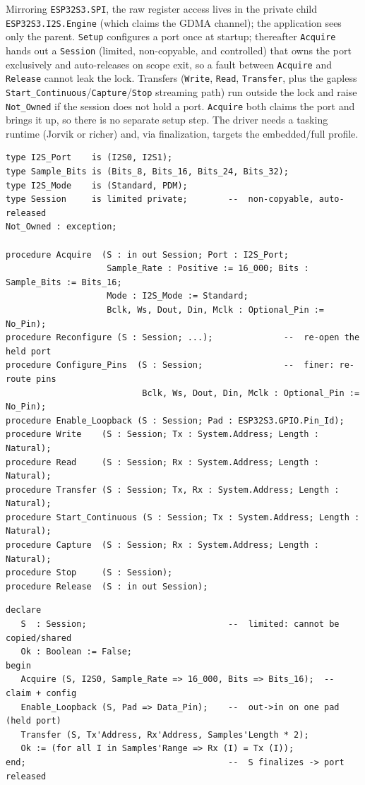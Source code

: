 Mirroring \texttt{ESP32S3.SPI}, the raw register access lives in the private child
\texttt{ESP32S3.I2S.Engine} (which claims the GDMA channel); the application sees
only the parent. \texttt{Setup} configures a port once at startup; thereafter
\texttt{Acquire} hands out a \texttt{Session} (limited, non-copyable, and
controlled) that owns the port exclusively and auto-releases on scope exit, so a
fault between \texttt{Acquire} and \texttt{Release} cannot leak the lock.
Transfers (\texttt{Write}, \texttt{Read}, \texttt{Transfer}, plus the gapless
\texttt{Start\_Continuous}/\texttt{Capture}/\texttt{Stop} streaming path) run
outside the lock and raise \texttt{Not\_Owned} if the session does not hold a
port. \texttt{Acquire} both claims the port and brings it up, so there is no
separate setup step. The driver needs a tasking runtime (Jorvik or richer) and,
via finalization, targets the embedded/full profile.

\begin{lstlisting}
type I2S_Port    is (I2S0, I2S1);
type Sample_Bits is (Bits_8, Bits_16, Bits_24, Bits_32);
type I2S_Mode    is (Standard, PDM);
type Session     is limited private;        --  non-copyable, auto-released
Not_Owned : exception;

procedure Acquire  (S : in out Session; Port : I2S_Port;
                    Sample_Rate : Positive := 16_000; Bits : Sample_Bits := Bits_16;
                    Mode : I2S_Mode := Standard;
                    Bclk, Ws, Dout, Din, Mclk : Optional_Pin := No_Pin);
procedure Reconfigure (S : Session; ...);              --  re-open the held port
procedure Configure_Pins  (S : Session;                --  finer: re-route pins
                           Bclk, Ws, Dout, Din, Mclk : Optional_Pin := No_Pin);
procedure Enable_Loopback (S : Session; Pad : ESP32S3.GPIO.Pin_Id);
procedure Write    (S : Session; Tx : System.Address; Length : Natural);
procedure Read     (S : Session; Rx : System.Address; Length : Natural);
procedure Transfer (S : Session; Tx, Rx : System.Address; Length : Natural);
procedure Start_Continuous (S : Session; Tx : System.Address; Length : Natural);
procedure Capture  (S : Session; Rx : System.Address; Length : Natural);
procedure Stop     (S : Session);
procedure Release  (S : in out Session);
\end{lstlisting}

\begin{lstlisting}
declare
   S  : Session;                            --  limited: cannot be copied/shared
   Ok : Boolean := False;
begin
   Acquire (S, I2S0, Sample_Rate => 16_000, Bits => Bits_16);  --  claim + config
   Enable_Loopback (S, Pad => Data_Pin);    --  out->in on one pad (held port)
   Transfer (S, Tx'Address, Rx'Address, Samples'Length * 2);
   Ok := (for all I in Samples'Range => Rx (I) = Tx (I));
end;                                        --  S finalizes -> port released
\end{lstlisting}

